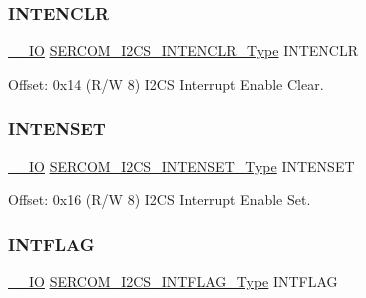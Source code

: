 \mbox{\label{struct_sercom_i2cs_a4dad9ef715ab90a350196029b86b99c7}} 
\subsubsection{\texorpdfstring{INTENCLR}{INTENCLR}}
{\footnotesize\ttfamily \mbox{\hyperlink{core__cm0plus_8h_aec43007d9998a0a0e01faede4133d6be}{\+\_\+\+\_\+\+IO}} \mbox{\hyperlink{union_s_e_r_c_o_m___i2_c_s___i_n_t_e_n_c_l_r___type}{S\+E\+R\+C\+O\+M\+\_\+\+I2\+C\+S\+\_\+\+I\+N\+T\+E\+N\+C\+L\+R\+\_\+\+Type}} I\+N\+T\+E\+N\+C\+LR}



Offset\+: 0x14 (R/W 8) I2\+CS Interrupt Enable Clear. 

\mbox{\label{struct_sercom_i2cs_a3e1d1378b663717dd882f5ba9ba45788}} 
\subsubsection{\texorpdfstring{INTENSET}{INTENSET}}
{\footnotesize\ttfamily \mbox{\hyperlink{core__cm0plus_8h_aec43007d9998a0a0e01faede4133d6be}{\+\_\+\+\_\+\+IO}} \mbox{\hyperlink{union_s_e_r_c_o_m___i2_c_s___i_n_t_e_n_s_e_t___type}{S\+E\+R\+C\+O\+M\+\_\+\+I2\+C\+S\+\_\+\+I\+N\+T\+E\+N\+S\+E\+T\+\_\+\+Type}} I\+N\+T\+E\+N\+S\+ET}



Offset\+: 0x16 (R/W 8) I2\+CS Interrupt Enable Set. 

\mbox{\label{struct_sercom_i2cs_a1b4aaca7510295245ee669312561f4d8}} 
\subsubsection{\texorpdfstring{INTFLAG}{INTFLAG}}
{\footnotesize\ttfamily \mbox{\hyperlink{core__cm0plus_8h_aec43007d9998a0a0e01faede4133d6be}{\+\_\+\+\_\+\+IO}} \mbox{\hyperlink{union_s_e_r_c_o_m___i2_c_s___i_n_t_f_l_a_g___type}{S\+E\+R\+C\+O\+M\+\_\+\+I2\+C\+S\+\_\+\+I\+N\+T\+F\+L\+A\+G\+\_\+\+Type}} I\+N\+T\+F\+L\+AG}



